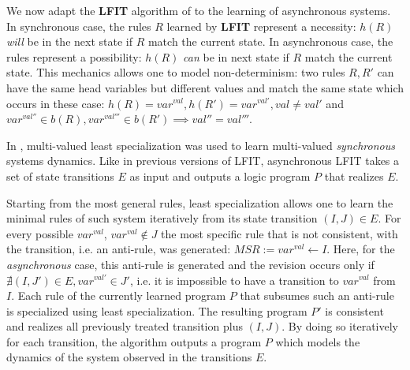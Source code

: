 We now adapt the {\bf LFIT} algorithm of \cite{ribeiro2015learning} to the learning of asynchronous systems.
In synchronous case, the rules $R$ learned by {\bf LFIT} represent a necessity: $h(R)$ \textit{will} be in the next state if $R$ match the current state.
In asynchronous case, the rules represent a possibility: $h(R)$ \textit{can} be in next state if $R$ match the current state.
This mechanics allows one to model non-determinism: two rules $R, R'$ can have the same head variables but different values and match the same state which occurs in these case:
$h(R)=var^{val}, h(R')=var^{val'}, val \neq val'$ and $var^{val''} \in b(R), var^{val'''}\in b(R') \implies val'' = val'''$.

In \cite{DMTRICLP15}, multi-valued least specialization was used to learn multi-valued \textit{synchronous} systems dynamics.
Like in previous versions of LFIT, asynchronous LFIT takes a set of state transitions $E$ as input and outputs a logic program $P$ that realizes $E$.

Starting from the most general rules, least specialization allows one to learn the minimal rules of such system iteratively from its state transition $(I,J) \in E$.
For every possible $var^{val}$, $var^{val} \not \in J$ the most specific rule that is not consistent, with the transition, i.e. an anti-rule, was generated: $MSR := var^{val} \leftarrow I$.
Here, for the \textit{asynchronous} case, this anti-rule is generated and the revision occurs only if $\nexists (I,J') \in E, var^{val'} \in J'$,
i.e. it is impossible to have a transition to $var^{val}$ from $I$.
Each rule of the currently learned program $P$ that subsumes such an anti-rule is specialized using least specialization.
The resulting program $P'$ is consistent and realizes all previously treated transition plus $(I,J)$.
By doing so iteratively for each transition, the algorithm outputs a program $P$ which models the dynamics of the system observed in the transitions $E$.

